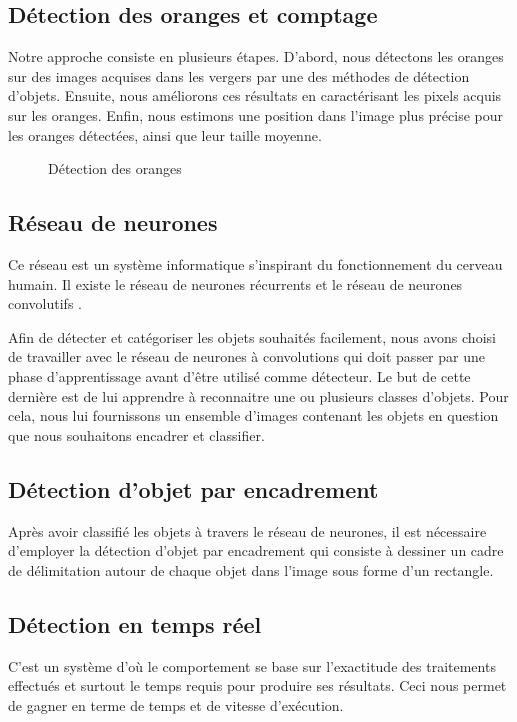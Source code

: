 \subsection{Détection des oranges et comptage}
Notre approche consiste en plusieurs étapes. D'abord, nous détectons les oranges sur des images acquises dans les vergers par une des méthodes de détection d’objets. Ensuite, nous améliorons ces résultats en caractérisant les pixels acquis sur les oranges. Enfin, nous estimons une position  dans l’image plus précise pour les oranges détectées, ainsi que leur taille moyenne.
	\begin{figure} [H]
	\begin{center}
		\caption{Détection des oranges}
	\end{center}
\end{figure}

\subsection{Réseau de neurones}
Ce réseau est un système informatique s'inspirant du fonctionnement du cerveau humain. Il existe le réseau de neurones récurrents et le réseau de neurones convolutifs \cite{Lebigdata}.

Afin de détecter et catégoriser les objets souhaités facilement, nous avons choisi de travailler avec le réseau de neurones à convolutions qui doit passer par une phase d’apprentissage avant d’être utilisé comme détecteur. Le but de cette dernière est de lui apprendre à reconnaitre une ou plusieurs classes d’objets. Pour cela, nous lui fournissons un ensemble d’images contenant les objets en question que nous souhaitons encadrer et classifier.
\subsection{Détection d'objet par encadrement}
Après avoir classifié les objets à travers le réseau de neurones, il est nécessaire d'employer la détection d'objet par encadrement qui consiste à dessiner un cadre de délimitation autour de chaque objet dans l’image sous forme d'un rectangle.
\subsection{Détection en temps réel}
C'est un système d'où le comportement se base sur l'exactitude des traitements effectués et surtout le temps requis pour produire ses résultats. Ceci nous permet de gagner en terme de temps et de vitesse d'exécution.
